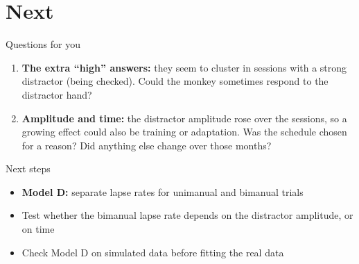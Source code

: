 \section{Next}

\begin{frame}{Questions for you}
  \begin{enumerate}
    \setlength{\itemsep}{1.2em}
    \item \textbf{The extra ``high'' answers:} they seem to cluster in sessions with a strong
          distractor (being checked). Could the monkey sometimes respond to the distractor
          hand?
    \item \textbf{Amplitude and time:} the distractor amplitude rose over the sessions, so a
          growing effect could also be training or adaptation. Was the schedule chosen for a
          reason? Did anything else change over those months?
  \end{enumerate}
\end{frame}

\begin{frame}{Next steps}
  \begin{itemize}
    \setlength{\itemsep}{1em}
    \item \textbf{Model D:} separate lapse rates for unimanual and bimanual trials
    \item Test whether the bimanual lapse rate depends on the distractor amplitude, or on time
    \item Check Model D on simulated data before fitting the real data
  \end{itemize}
\end{frame}
